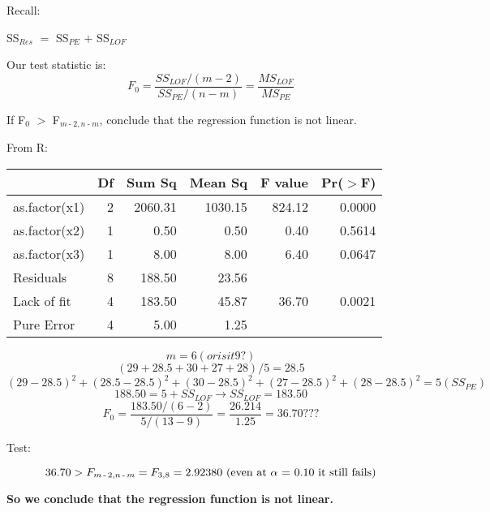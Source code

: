 \documentclass{article}
\newcommand{\mt}[1]{\ensuremath{#1}}
\newcommand{\afa}{\mt{\alpha} }
\newcommand{\lra}{ \mt{\longrightarrow} } %
\newcommand{\ps}{\mt{\operatorname{+}} }
\newcommand{\ms}{\mt{\operatorname{-}} }
\newcommand{\gr}{\mt{\operatorname{>}} }
\newcommand{\eql}{ \mt{\operatorname{=}} }
\newcommand{\uw}[2]{#1\mt{_{#2}}}
\newcommand{\eqn}[1]{\[#1\]}
\begin{document}
{{Recall:

\uw{SS}{Res} \eql \uw{SS}{PE} \ps \uw{SS}{LOF}

Our test statistic is:
\eqn{F_0 = \frac{SS_{LOF} / (m - 2)}{SS_{PE} / (n - m)} = \frac{MS_{LOF}}{MS_{PE}}}

If \uw{F}{0} \gr \uw{F}{m \ms 2, n \ms m}, conclude that the regression function is not linear.

From R:

\begin{table}[ht]
\centering
\begin{tabular}{lrrrrr}
  \hline
 & Df & Sum Sq & Mean Sq & F value & Pr($>$F) \\ 
  \hline
as.factor(x1) & 2 & 2060.31 & 1030.15 & 824.12 & 0.0000 \\ 
  as.factor(x2) & 1 & 0.50 & 0.50 & 0.40 & 0.5614 \\ 
  as.factor(x3) & 1 & 8.00 & 8.00 & 6.40 & 0.0647 \\ 
  Residuals & 8 & 188.50 & 23.56 &  &  \\ 
   Lack of fit & 4 & 183.50 & 45.87 & 36.70 & 0.0021 \\ 
   Pure Error & 4 & 5.00 & 1.25 &  &  \\ 
   \hline
\end{tabular}
\end{table}

\eqn{m = 6 (or is it 9?)}
\eqn{(29 + 28.5 + 30 + 27 + 28) / 5 = 28.5}
\eqn{(29 - 28.5)^2 + (28.5 - 28.5)^2 + (30 - 28.5)^2 + (27 - 28.5)^2 + (28 - 28.5)^2 \eql 5 (SS_{PE})}
\eqn{188.50 = 5 + SS_{LOF} \lra SS_{LOF} = 183.50}
\eqn{F_0 = \frac{183.50 / (6 - 2)}{5 / (13 - 9)} = \frac{26.214}{1.25} = 36.70???}

Test:

\eqn{36.70 > \uw{F}{m \ms 2, n \ms m} = F_{3, 8} = 2.92380 \textrm{ (even at \afa \eql 0.10 it still fails)}}

\textbf{So we conclude that the regression function is not linear.}

}

}

\newpage
\end{document}
